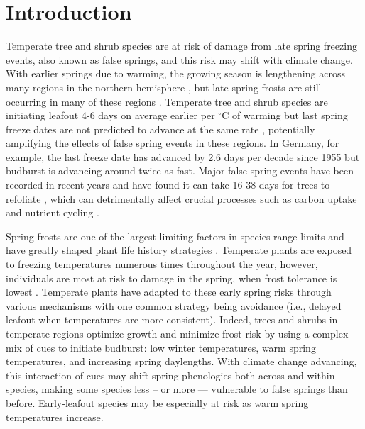 \documentclass{article}\usepackage[]{graphicx}\usepackage[]{color}
\begin{document}
\section*{Introduction}
Temperate tree and shrub species are at risk of damage from late spring freezing events, also known as false springs, and this risk may shift with climate change. With earlier springs due to warming, the growing season is lengthening across many regions in the northern hemisphere \citep{Chen2005, Kukal2018, Liu2006}, but late spring frosts are still occurring in many of these regions \citep{Wypych2016a}. Temperate tree and shrub species are initiating leafout 4-6 days on average earlier per $^{\circ}$C of warming \citep{IPCC2014, Wolkovich2012} but last spring freeze dates are not predicted to advance at the same rate \citep{Inouye2008, Labe2016, Martin2010, Sgubin2018}, potentially amplifying the effects of false spring events in these regions. In Germany, for example, the last freeze date has advanced by 2.6 days per decade since 1955 \citep{Zohner2016} but budburst is advancing around twice as fast. Major false spring events have been recorded in recent years and have found it can take 16-38 days for trees to refoliate \citep{Augspurger2009, Augspurger2013, Gu2008, Menzel2015}, which can detrimentally affect crucial processes such as carbon uptake and nutrient cycling \citep{Hufkens2012, Klosterman2018, Richardson2013}.

Spring frosts are one of the largest limiting factors in species range limits and have greatly shaped plant life history strategies \citep{Kollas2014}. Temperate plants are exposed to freezing temperatures numerous times throughout the year, however, individuals are most at risk to damage in the spring, when frost tolerance is lowest \citep{Sakai1987}. Temperate plants have adapted to these early spring risks through various mechanisms with one common strategy being avoidance (i.e., delayed leafout when temperatures are more consistent). Indeed, trees and shrubs in temperate regions optimize growth and minimize frost risk by using a complex mix of cues to initiate budburst: low winter temperatures, warm spring temperatures, and increasing spring daylengths. With climate change advancing, this interaction of cues may shift spring phenologies both across and within species, making some species less -- or more --- vulnerable to false springs than before. Early-leafout species may be especially at risk as warm spring temperatures increase.
 
\end{document}
